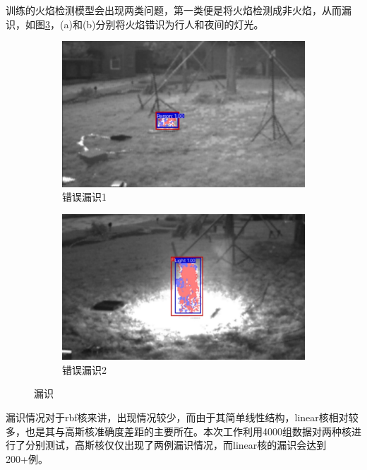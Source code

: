 训练的火焰检测模型会出现两类问题，第一类便是将火焰检测成非火焰，从而漏识，如图\ref{21}，(a)和(b)分别将火焰错识为行人和夜间的灯光。
\begin{figure}[ht]
    \centering
    \begin{subfigure}{0.49\textwidth}
        \centering
        \includegraphics[width=\textwidth]{figures/jiance3.png}
        \caption{错误漏识1}
        \label{21.a}
    \end{subfigure}
    \hfill
    \begin{subfigure}{0.49\textwidth}
        \centering
        \includegraphics[width=\textwidth]{figures/jiance7.png}
        \caption{错误漏识2}
        \label{21.b}
    \end{subfigure}
    \caption{漏识}
    \label{21}
\end{figure}

漏识情况对于rbf核来讲，出现情况较少，而由于其简单线性结构，linear核相对较多，也是其与高斯核准确度差距的主要所在。本次工作利用4000组数据对两种核进行了分别测试，高斯核仅仅出现了两例漏识情况，而linear核的漏识会达到200+例。

